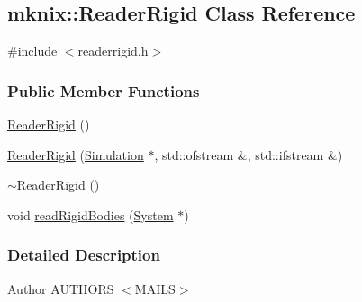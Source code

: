 \hypertarget{classmknix_1_1_reader_rigid}{\subsection{mknix\-:\-:Reader\-Rigid Class Reference}
\label{classmknix_1_1_reader_rigid}
}


{\ttfamily \#include $<$readerrigid.\-h$>$}

\subsubsection*{Public Member Functions}
\begin{DoxyCompactItemize}
\item 
\hyperlink{classmknix_1_1_reader_rigid_a0de3ec723521140e6430030cb28d328c}{Reader\-Rigid} ()
\item 
\hyperlink{classmknix_1_1_reader_rigid_aa109b7793a9257daa713eceeee0bba67}{Reader\-Rigid} (\hyperlink{classmknix_1_1_simulation}{Simulation} $\ast$, std\-::ofstream \&, std\-::ifstream \&)
\item 
\hyperlink{classmknix_1_1_reader_rigid_ad220ff7f0dd151dd86142e6c3b7c4c80}{$\sim$\-Reader\-Rigid} ()
\item 
void \hyperlink{classmknix_1_1_reader_rigid_a1ba28c15299f94ef88eecf51604e8c82}{read\-Rigid\-Bodies} (\hyperlink{classmknix_1_1_system}{System} $\ast$)
\end{DoxyCompactItemize}


\subsubsection{Detailed Description}
\begin{DoxyAuthor}{Author}
A\-U\-T\-H\-O\-R\-S $<$\-M\-A\-I\-L\-S$>$ 
\end{DoxyAuthor}


